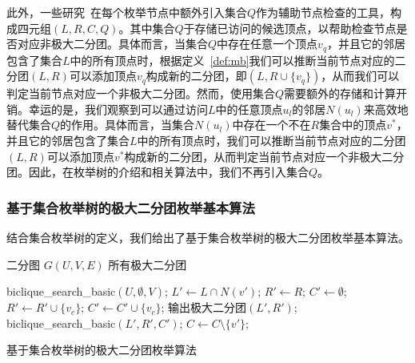此外，一些研究~\cite{iMBEA14,ooMBE22}在每个枚举节点中额外引入集合$Q$作为辅助节点检查的工具，构成四元组$(L,R,C,Q)$。其中集合$Q$于存储已访问的候选顶点，以帮助检查节点是否对应非极大二分团。具体而言，当集合$Q$中存在任意一个顶点$v_q$，并且它的邻居包含了集合$L$中的所有顶点时，根据定义~\ref{def:mb}我们可以推断当前节点对应的二分团$(L,R)$可以添加顶点$v_q$构成新的二分团，即$(L, R\cup\{v_q\})$，从而我们可以判定当前节点对应一个非极大二分团。然而，使用集合$Q$需要额外的存储和计算开销。幸运的是，我们观察到可以通过访问$L$中的任意顶点$u_l$的邻居$N(u_l)$来高效地替代集合$Q$的作用。具体而言，当集合$N(u_l)$中存在一个不在$R$集合中的顶点$v^*$，并且它的邻居包含了集合$L$中的所有顶点时，我们可以推断当前节点对应的二分团$(L,R)$可以添加顶点$v^*$构成新的二分团，从而判定当前节点对应一个非极大二分团。因此，在枚举树的介绍和相关算法中，我们不再引入集合$Q$。

\subsubsection{基于集合枚举树的极大二分团枚举基本算法}
\label{subsec:algorithm}
  结合集合枚举树的定义，我们给出了基于集合枚举树的极大二分团枚举基本算法。

\begin{algorithm}[H]
    \begin{algorithmic}[1]
        \normalsize
        \REQUIRE 二分图 $G(U,V,E)$
        \ENSURE 所有极大二分团
        
        \renewcommand{\algorithmicwhile}{\textbf{procedure}}
        \renewcommand{\algorithmicdo}{\textbf{:}}


        \STATE \textsf{biclique\_search\_basic}$(U,\emptyset,V)$;
        \renewcommand{\algorithmicdo}{\textbf{do}}
            \STATE $L' \leftarrow L \cap N(v')$; $R'\leftarrow R$; $C' \leftarrow \emptyset$;
                \STATE $R' \leftarrow R' \cup \{v_c\}$;
                \STATE $C' \leftarrow C' \cup \{v_c\}$;
              \ENDIF
            \ENDFOR
              \STATE 输出极大二分团$(L', R')$;
              \STATE \textsf{biclique\_search\_basic}$(L',R',C')$;
            \ENDIF
            \STATE $C \leftarrow C \setminus \{v'\}; $
          \ENDFOR

        \ENDWHILE

    \end{algorithmic}
    \caption{基于集合枚举树的极大二分团枚举算法}
    \label{alg:se_mbe}
\end{algorithm}

